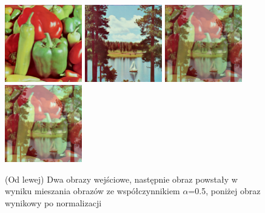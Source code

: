 \documentclass[final,a4paper,openany,12pt]{mwbk}
\begin{document}
\begin{figure}[H]
	\begin{center}
		\includegraphics[width=0.3\textwidth]{1/1Color_Mix_Img1_Original}
		\includegraphics[width=0.3\textwidth]{1/1Color_Mix_Img2_Original}
		\includegraphics[width=0.3\textwidth]{1/1Color_Mix_Img_Result}
		\includegraphics[width=0.3\textwidth]{1/1Color_Mix_Img_Result_Norm}
	\end{center}
	\caption{(Od lewej) Dwa obrazy wejściowe, następnie obraz powstały w wyniku mieszania obrazów ze współczynnikiem $\alpha$=0.5, poniżej obraz wynikowy po normalizacji }
\end{figure}
\end{document}
